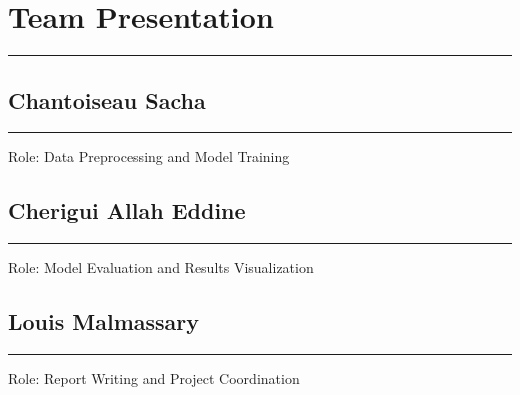 \documentclass{article}
\begin{document}
\section{Team Presentation}
\noindent\rule{\textwidth}{1pt} %
\subsection{Chantoiseau Sacha}
\noindent\rule{\textwidth}{1pt} %
Role: Data Preprocessing and Model Training

\subsection{Cherigui Allah Eddine}
\noindent\rule{\textwidth}{1pt} %
Role: Model Evaluation and Results Visualization

\subsection{Louis Malmassary}
\noindent\rule{\textwidth}{1pt} %
Role: Report Writing and Project Coordination
\end{document}
